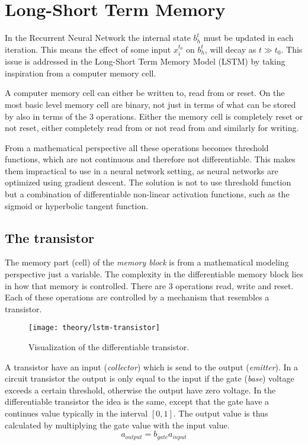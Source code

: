 
\section{Long-Short Term Memory}
\label{sec:Long-Short-Term-Memory}
In the Recurrent Neural Network the internal state $b_h^t$ must be updated in each iteration. This means the effect of some input $x_i^{t_0}$ on $b_h^{t}$, will decay as $t \gg t_0$. This issue is addressed in the Long-Short Term Memory Model (LSTM) by taking inspiration from a computer memory cell.

A computer memory cell can either be written to, read from or reset. On the most basic level memory cell are binary, not just in terms of what can be stored by also in terms of the 3 operations. Either the memory cell is completely reset or not reset, either completely read from or not read from and similarly for writing.

From a mathematical perspective all these operations becomes threshold functions, which are not continuous and therefore not differentiable. This makes them impractical to use in a neural network setting, as neural networks are optimized using gradient descent. The solution is not to use threshold function but a combination of differentiable non-linear activation functions, such as the sigmoid or hyperbolic tangent function.

\subsection{The transistor}

The memory part (cell) of the \textit{memory block} is from a mathematical modeling perspective just a variable. The complexity in the differentiable memory block lies in how that memory is controlled. There are 3 operations read, write and reset. Each of these operations are controlled by a mechanism that resembles a transistor.

\begin{figure}[h]
	\centering
	\texttt{[image: theory/lstm-transistor]}
	\caption{Visualization of the differentiable transistor.}
	\label{fig:theory:lstm:lstm-transistor}
\end{figure}

A transistor have an input (\textit{collector}) which is send to the output (\textit{emitter}). In a circuit transistor the output is only equal to the input if the gate (\textit{base}) voltage exceeds a certain threshold, otherwise the output have zero voltage. In the differentiable transistor the idea is the same, except that the gate have a continues value typically in the interval $[0, 1]$. The output value is thus calculated by multiplying the gate value with the input value.
\begin{equation}
a_{output} = b_{gate} a_{input}
\end{equation}

